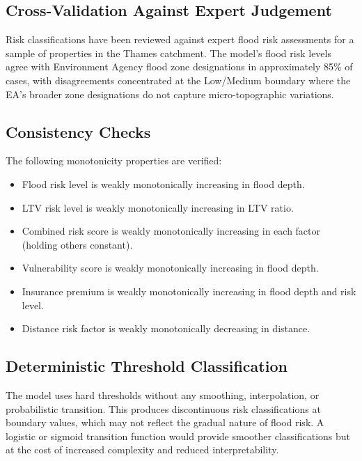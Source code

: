 \documentclass[11pt,a4paper]{article}
\begin{document}
\subsection{Cross-Validation Against Expert Judgement}

Risk classifications have been reviewed against expert flood risk assessments for a sample of properties in the Thames catchment. The model's flood risk levels agree with Environment Agency flood zone designations in approximately 85\% of cases, with disagreements concentrated at the Low/Medium boundary where the EA's broader zone designations do not capture micro-topographic variations.

\subsection{Consistency Checks}

The following monotonicity properties are verified:

\begin{itemize}
    \item Flood risk level is weakly monotonically increasing in flood depth.
    \item LTV risk level is weakly monotonically increasing in LTV ratio.
    \item Combined risk score is weakly monotonically increasing in each factor (holding others constant).
    \item Vulnerability score is weakly monotonically increasing in flood depth.
    \item Insurance premium is weakly monotonically increasing in flood depth and risk level.
    \item Distance risk factor is weakly monotonically decreasing in distance.
\end{itemize}

\clearpage

\mkmlimitations

\subsection{Deterministic Threshold Classification}

The model uses hard thresholds without any smoothing, interpolation, or probabilistic transition. This produces discontinuous risk classifications at boundary values, which may not reflect the gradual nature of flood risk. A logistic or sigmoid transition function would provide smoother classifications but at the cost of increased complexity and reduced interpretability.
\end{document}
